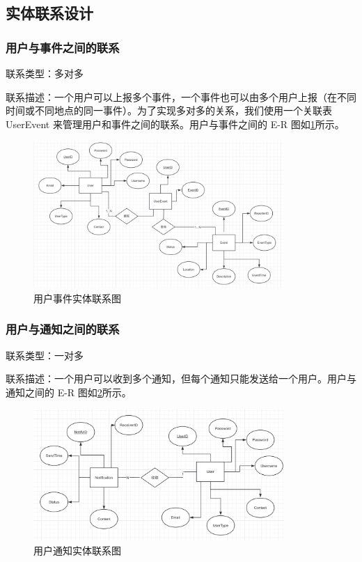 \subsection{实体联系设计}

\subsubsection{用户与事件之间的联系}

联系类型：多对多

联系描述：一个用户可以上报多个事件，一个事件也可以由多个用户上报（在不同时间或不同地点的同一事件）。为了实现多对多的关系，我们使用一个关联表 UserEvent 来管理用户和事件之间的联系。用户与事件之间的 E-R 图如\cref{fig:rela-user-event}所示。

\begin{figure}[htbp]
    \centering
    \includegraphics[width=0.85\textwidth]{figures/db-img-rela-01.png}
    \caption{用户事件实体联系图}
    \label{fig:rela-user-event}
\end{figure}

\subsubsection{用户与通知之间的联系}

联系类型：一对多

联系描述：一个用户可以收到多个通知，但每个通知只能发送给一个用户。用户与通知之间的 E-R 图如\cref{fig:rela-user-notification}所示。

\begin{figure}[htbp]
    \centering
    \includegraphics[width=0.85\textwidth]{figures/db-img-rela-02.png}
    \caption{用户通知实体联系图}
    \label{fig:rela-user-notification}
\end{figure}

